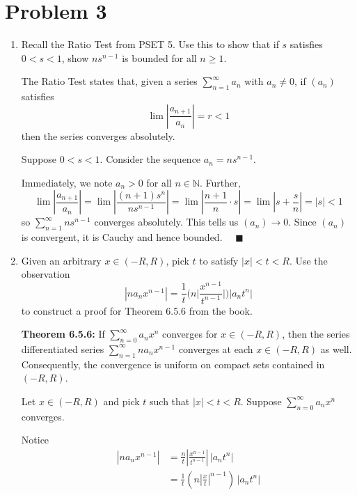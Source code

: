 \documentclass[12pt]{article}
\newcommand{\N}{\mathbb{N}}
\newcommand{\qed}{\quad \blacksquare}
\newcommand{\abs}[1]{\left\vert #1 \right\vert}
\begin{document}
\pagebreak


\section*{Problem 3 }
\begin{enumerate}
	\item Recall the Ratio Test from PSET 5. Use this to show that if $s$ satisfies $0<s<1$, show $ns^{n-1}$ is bounded for all $n\geq1$.
    
        \color{blue}
            The Ratio Test states that, given a series $\sum_{n=1}^{\infty} a_n$ with $a_n \neq 0$, if $(a_n)$ satisfies 
            \[\lim \abs{\frac{a_{n+1}}{a_n}} = r < 1\]
            then the series converges absolutely. 

            Suppose $0 < s < 1$. Consider the sequence $a_n = ns^{n-1}$. 

            Immediately, we note $a_n> 0$ for all $n \in \N$. Further, 
            \[\lim \abs{\frac{a_{n+1}}{a_n}} = \lim \abs{\frac{(n+1)s^n}{ns^{n-1}}} = \lim \abs{\frac{n+1}{n} \cdot s} = \lim \abs{s + \frac{s}{n}} = \abs{s} < 1\] 
            so $\sum_{n=1}^{\infty} ns^{n-1}$ converges absolutely. This tells us $(a_n) \to 0$. Since $(a_n)$ is convergent, it is Cauchy and hence bounded. $\qed$

        \color{black}

	\item Given an arbitrary $x\in(-R,R)$, pick $t$ to satisfy $|x|<t<R$. Use the observation 
	\begin{equation*}
		|na_nx^{n-1}|=\frac{1}{t}\bigg(n\bigg|\frac{x^{n-1}}{t^{n-1}} \bigg|\bigg)|a_nt^n|
	\end{equation*}
	 to construct a proof for Theorem 6.5.6 from the book.

        \color{blue}
            \textbf{Theorem 6.5.6:} If $\sum_{n=0}^{\infty} a_nx^n$ converges for $x \in (-R, R)$, then the series differentiated series $\sum_{n=1}^{\infty} na_nx^{n-1}$ converges at each $x \in (-R, R)$ as well. Consequently, the convergence is uniform on compact sets contained in $(-R, R)$.
            
            Let $x \in (-R, R)$ and pick $t$ such that $|x| < t < R$. Suppose $\sum_{n=0}^{\infty} a_nx^n$ converges.

            Notice 
            \begin{align*}
                \abs{na_n x^{n-1}} &= \frac{n}{t} \abs{\frac{x^{n-1}}{t^{n-1}}} \, \abs{a_n t^n}\\ 
                    &= \frac{1}{t} \left(n\abs{\frac{x}{t}}^{n-1}\right) \, \abs{a_n t^n}
            \end{align*}


\end{enumerate}
\end{document}
